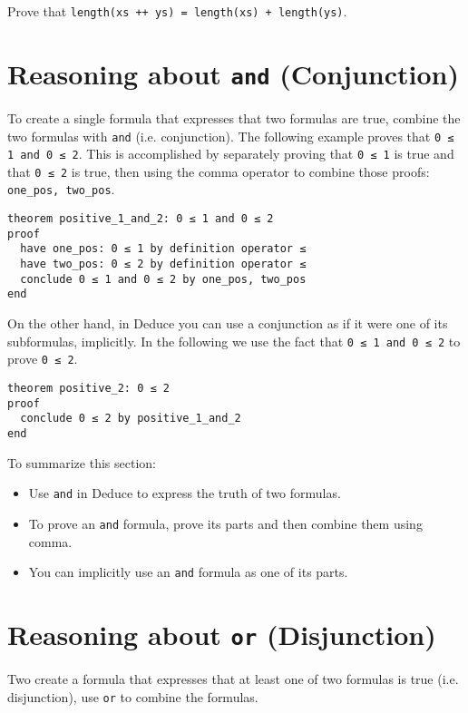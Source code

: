 \documentclass[12pt]{article}
\begin{document}
Prove that \texttt{length(xs ++ ys) = length(xs) + length(ys)}.

\clearpage

\section{Reasoning about \texttt{and} (Conjunction)}
\label{sec:conjunction}

To create a single formula that expresses that two formulas are true,
combine the two formulas with \texttt{and} (i.e. conjunction). The
following example proves that \texttt{0 ≤ 1 and 0 ≤ 2}.  This is
accomplished by separately proving that \texttt{0 ≤ 1} is true and
that \texttt{0 ≤ 2} is true, then using the comma operator to combine
those proofs: \texttt{one\_pos, two\_pos}.

\begin{verbatim}
theorem positive_1_and_2: 0 ≤ 1 and 0 ≤ 2
proof
  have one_pos: 0 ≤ 1 by definition operator ≤
  have two_pos: 0 ≤ 2 by definition operator ≤
  conclude 0 ≤ 1 and 0 ≤ 2 by one_pos, two_pos
end
\end{verbatim}

On the other hand, in Deduce you can use a conjunction as if it were
one of its subformulas, implicitly. In the following we use the
fact that \texttt{0 ≤ 1 and 0 ≤ 2} to prove \texttt{0 ≤ 2}.

\begin{verbatim}
theorem positive_2: 0 ≤ 2
proof
  conclude 0 ≤ 2 by positive_1_and_2
end
\end{verbatim}

To summarize this section:
\begin{itemize}
\item Use \texttt{and} in Deduce to express the truth of two formulas.
\item To prove an \texttt{and} formula, prove its parts and then
  combine them using comma.
\item You can implicitly use an \texttt{and} formula as one of its
  parts.
\end{itemize}

\pagebreak

\section{Reasoning about \texttt{or} (Disjunction)}
\label{sec:disjunction}

Two create a formula that expresses that at least one of two formulas
is true (i.e. disjunction), use \texttt{or} to combine the formulas.
\end{document}
